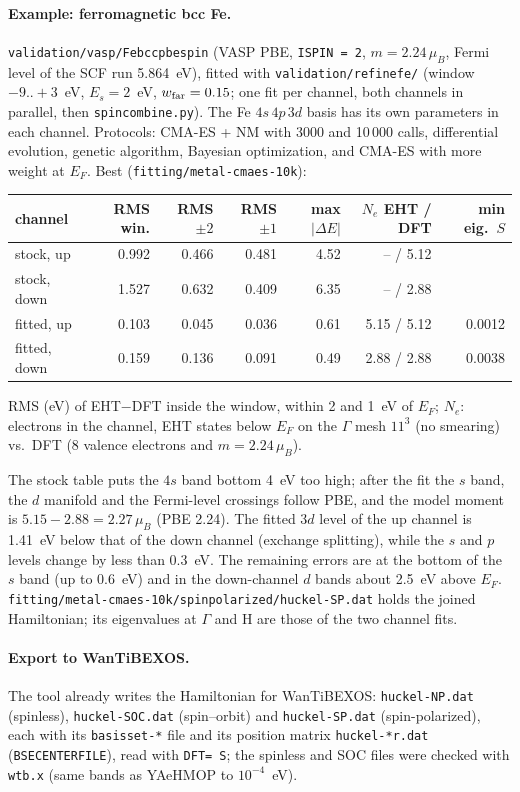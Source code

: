 \documentclass[11pt,a4paper]{article}
\newcommand{\cmd}[1]{\texttt{#1}}
\renewcommand{\_}{\origunderscore\allowbreak}
\begin{document}
\paragraph{Example: ferromagnetic bcc Fe.} \cmd{validation/vasp/Fe\_bcc\_pbe\_spin} (VASP PBE, \cmd{ISPIN = 2},
$m=2.24\,\mu_B$, Fermi level of the SCF run 5.864~eV), fitted with \cmd{validation/refine\_fe/} (window $-9..+3$~eV,
$E_s=2$~eV, $w_{\rm far}=0.15$; one fit per channel, both channels in parallel, then \cmd{spin\_combine.py}). The Fe
$4s\,4p\,3d$ basis has its own parameters in each channel. Protocols: CMA-ES + NM with 3000 and 10\,000 calls,
differential evolution, genetic algorithm, Bayesian optimization, and CMA-ES with more weight at $E_F$. Best
(\cmd{fitting/metal-cmaes-10k}):
\begin{center}\footnotesize\setlength{\tabcolsep}{4pt}
\begin{tabular}{l r r r r r r}
\toprule
channel & RMS win. & RMS $\pm2$ & RMS $\pm1$ & max $|\Delta E|$ & $N_e$ EHT / DFT & min eig.\ $S$ \\
\midrule
stock, up & 0.992 & 0.466 & 0.481 & 4.52 & -- / 5.12 & \\
stock, down & 1.527 & 0.632 & 0.409 & 6.35 & -- / 2.88 & \\
fitted, up & 0.103 & 0.045 & 0.036 & 0.61 & 5.15 / 5.12 & 0.0012 \\
fitted, down & 0.159 & 0.136 & 0.091 & 0.49 & 2.88 / 2.88 & 0.0038 \\
\bottomrule
\end{tabular}\end{center}
{\footnotesize RMS (eV) of EHT$-$DFT inside the window, within 2 and 1~eV of $E_F$; $N_e$: electrons in the channel, EHT states below $E_F$ on the
$\Gamma$ mesh $11^3$ (no smearing) vs.\ DFT (8 valence electrons and $m=2.24\,\mu_B$).}

The stock table puts the $4s$ band bottom 4~eV too high; after the fit the $s$ band, the $d$ manifold and the Fermi-level
crossings follow PBE, and the model moment is $5.15-2.88=2.27\,\mu_B$ (PBE 2.24). The fitted $3d$ level of the up channel
is 1.41~eV below that of the down channel (exchange splitting), while the $s$ and $p$ levels change by less than 0.3~eV.
The remaining errors are at the bottom of the $s$ band (up to 0.6~eV) and in the down-channel $d$ bands about 2.5~eV above
$E_F$. \cmd{fitting/metal-cmaes-10k/spin\_polarized/huckel-SP.dat} holds the joined Hamiltonian; its eigenvalues at
$\Gamma$ and H are those of the two channel fits.

\paragraph{Export to WanTiBEXOS.} The tool already writes the Hamiltonian for WanTiBEXOS: \cmd{huckel-NP.dat} (spinless),
\cmd{huckel-SOC.dat} (spin--orbit) and \cmd{huckel-SP.dat} (spin-polarized), each with its \cmd{basis\_set-*} file and its position
matrix \cmd{huckel-*\_r.dat} (\cmd{BSE\_CENTER\_FILE}), read with \cmd{DFT= S}; the spinless and SOC files were checked with \cmd{wtb.x} (same bands as YAeHMOP to $10^{-4}$~eV).
\end{document}
